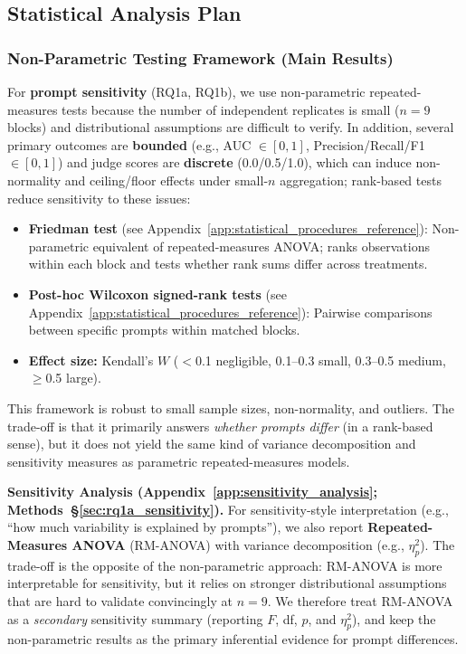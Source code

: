 \subsection{Statistical Analysis Plan}

\subsubsection{Non-Parametric Testing Framework (Main Results)}
\label{sec:nonparam_framework}

For \textbf{prompt sensitivity} (RQ1a, RQ1b), we use non-parametric repeated-measures tests because the number of independent replicates is small ($n=9$ blocks) and distributional assumptions are difficult to verify. In addition, several primary outcomes are \textbf{bounded} (e.g., AUC $\in[0,1]$, Precision/Recall/F1 $\in[0,1]$) and judge scores are \textbf{discrete} (0.0/0.5/1.0), which can induce non-normality and ceiling/floor effects under small-$n$ aggregation; rank-based tests reduce sensitivity to these issues:
\begin{itemize}[noitemsep]
    \item \textbf{Friedman test} (see Appendix~\ref{app:statistical_procedures_reference}): Non-parametric equivalent of repeated-measures ANOVA; ranks observations within each block and tests whether rank sums differ across treatments.
    \item \textbf{Post-hoc Wilcoxon signed-rank tests} (see Appendix~\ref{app:statistical_procedures_reference}): Pairwise comparisons between specific prompts within matched blocks.
    \item \textbf{Effect size:} Kendall's $W$ ($<$0.1 negligible, 0.1--0.3 small, 0.3--0.5 medium, $\geq$0.5 large).
\end{itemize}

This framework is robust to small sample sizes, non-normality, and outliers. The trade-off is that it primarily answers \textit{whether prompts differ} (in a rank-based sense), but it does not yield the same kind of variance decomposition and sensitivity measures as parametric repeated-measures models.

\textbf{Sensitivity Analysis (Appendix~\ref{app:sensitivity_analysis}; Methods~\S\ref{sec:rq1a_sensitivity}).} For sensitivity-style interpretation (e.g., ``how much variability is explained by prompts''), we also report \textbf{Repeated-Measures ANOVA} (RM-ANOVA) with variance decomposition (e.g., $\eta^2_p$). The trade-off is the opposite of the non-parametric approach: RM-ANOVA is more interpretable for sensitivity, but it relies on stronger distributional assumptions that are hard to validate convincingly at $n=9$. We therefore treat RM-ANOVA as a \textit{secondary} sensitivity summary (reporting $F$, df, $p$, and $\eta^2_p$), and keep the non-parametric results as the primary inferential evidence for prompt differences.

